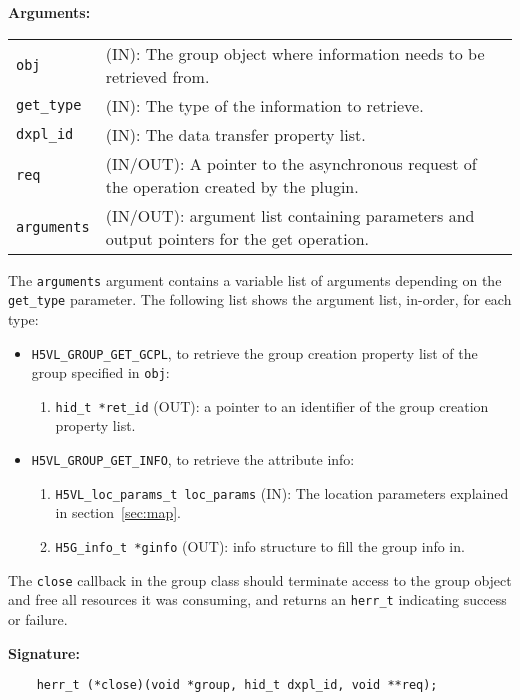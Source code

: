 \textbf{Arguments:}\\
\begin{tabular}{l p{10cm}}
  {\tt obj} & (IN): The group object where information needs to be
  retrieved from.\\
  {\tt get\_type} & (IN): The type of the information to retrieve.\\
  {\tt dxpl\_id} & (IN): The data transfer property list.\\
  {\tt req} & (IN/OUT): A pointer to the asynchronous request of the
  operation created by the plugin.\\
  {\tt arguments} & (IN/OUT): argument list containing parameters and
  output pointers for the get operation. \\
\end{tabular}

The {\tt arguments} argument contains a variable list of arguments
depending on the {\tt get\_type} parameter. The following list shows
the argument list, in-order, for each type:

\begin{itemize}
\item {\tt H5VL\_GROUP\_GET\_GCPL}, to retrieve the group creation
  property list of the group specified in {\tt obj}:
  \begin{enumerate}
  \item {\tt hid\_t *ret\_id} (OUT): a pointer to an identifier of the
    group creation property list.
  \end{enumerate}

\item {\tt H5VL\_GROUP\_GET\_INFO}, to retrieve the attribute info:
  \begin{enumerate}
  \item {\tt H5VL\_loc\_params\_t loc\_params} (IN): The location parameters
    explained in section~\ref{sec:map}. 
  \item {\tt H5G\_info\_t *ginfo} (OUT): info structure to fill the
    group info in.
  \end{enumerate}
\end{itemize}

The {\tt close} callback in the group class should terminate access to
the group object and free all resources it was consuming, and returns
an {\tt herr\_t} indicating success or failure.

\textbf{Signature:}
\begin{lstlisting}
    herr_t (*close)(void *group, hid_t dxpl_id, void **req);
\end{lstlisting}

